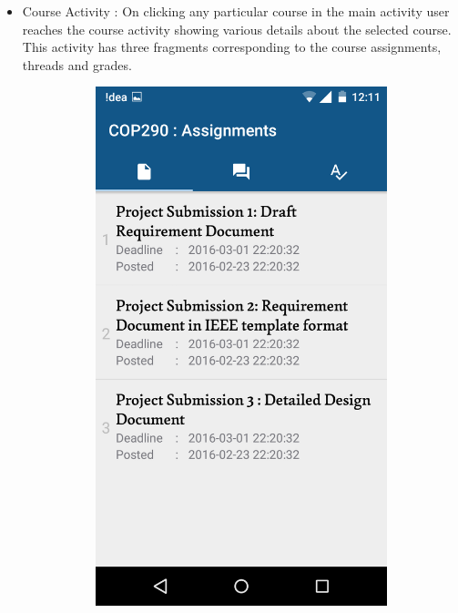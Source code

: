 \documentclass{article}
\begin{document}
\begin{itemize}
\begin{itemize}
\end{itemize}
\item Course Activity : On clicking any particular course in the main activity user reaches the course activity showing various details about the selected course. This activity has three fragments corresponding to the course assignments, threads and grades.\\
\begin{figure}[!h]
\centering
\begin{subfigure}{.4\textwidth}
  \centering
	\includegraphics[width=0.8\linewidth]{pic6}
    \caption*{}
\end{subfigure}
\begin{subfigure}{.4\textwidth}
  \centering

\end{subfigure}
\end{figure}
\end{itemize}
\end{document}
